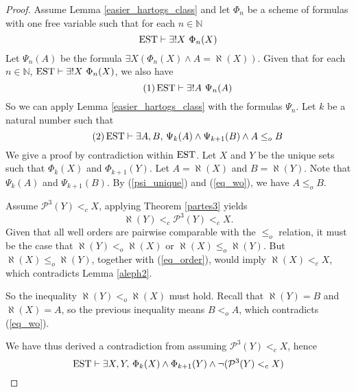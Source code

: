 \begin{proof}
	Assume Lemma \ref{easier_hartogs_class} and let $\Phi_n$ be a scheme of formulas with one free variable such that for each $n\in\mathbb{N}$
	\[
		\operatorname{EST} \vdash \exists! X \ \Phi_n (X)
	\]
	Let $\Psi_n (A)$ be the formula $\exists X (\Phi_n (X) \land A = \aleph(X))$.
	Given that for each $n\in\mathbb{N}$, $\operatorname{EST} \vdash \exists! X \ \Phi_n (X)$, we also have 
	\begin{equation}\tag{1}
		\label{psi_unique}
		\operatorname{EST} \vdash \exists! A \ \Psi_n (A)	
	\end{equation}
	So we can apply Lemma \ref{easier_hartogs_class} with the formulas $\Psi_n$. Let $k$ be a natural number such that 
	\begin{equation}\tag{2}
		\label{eq_wo}
		\operatorname{EST} \vdash \exists A,B, \, \Psi_k (A) \land \Psi_{k+1} (B) \land A \leq_o B
	\end{equation}
	We give a proof by contradiction within $\operatorname{EST}$. Let $X$ and $Y$ be the unique sets such that $\Phi_k (X)$ and $\Phi_{k+1} (Y)$. Let $A = \aleph(X)$ and $B = \aleph(Y)$.
	Note that $\Psi_k (A)$ and $\Psi_{k+1} (B)$. By (\ref{psi_unique}) and (\ref{eq_wo}), we have $A \leq_o B$.

	Assume $\mathcal{P}^{3}(Y) <_c X$, applying Theorem \ref{partes3} yields
	\begin{equation}\tag{3}
		\label{eq_order}
		\aleph(Y) <_c \mathcal{P}^{3} (Y) <_c X. 
	\end{equation}
	Given that all well orders are pairwise comparable with the $\leq_o$ relation, it must be the case that $\aleph(Y) <_o \aleph(X)$ or $\aleph(X) \leq_o \aleph(Y)$.
	But $\aleph(X) \leq_o \aleph(Y)$, together with (\ref{eq_order}), would imply $\aleph(X) <_c X$, which contradicts Lemma \ref{aleph2}.
	
	So the inequality $\aleph(Y) <_o \aleph(X)$  must hold. Recall that $\aleph(Y) = B$ and $\aleph(X) = A$, so the previous inequality means $B <_o A$, which contradicts (\ref{eq_wo}).
	
	We have thus derived a contradiction from assuming $\mathcal{P}^{3}(Y) <_c X$, hence
	\[
		\operatorname{EST} \vdash \exists X,Y ,\, \Phi_k (X) \land \Phi_{k+1} (Y) \land \neg(\mathcal{P}^{3}(Y) <_c X)
	\]
\end{proof}

